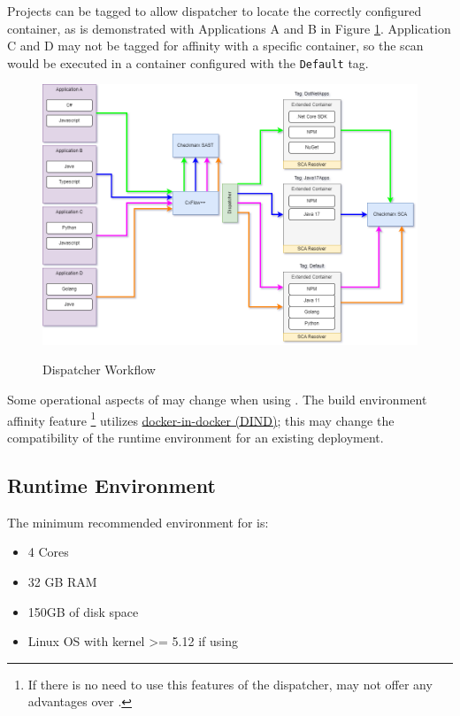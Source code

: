 Projects can be tagged to allow dispatcher to locate the correctly configured \scaresolver
container, as is demonstrated with Applications A and B in Figure \ref{fig:dispatcher_workflow}.
Application C and D may not be tagged for affinity with a specific container, so the
\scaresolver scan would be executed in a container configured with the \texttt{Default} tag.

\begin{figure}[h]
    \caption{\cxflowplusplus Dispatcher Workflow}
    \includegraphics[width=\textwidth]{graphics/dispatcher_workflow.png}
    \label{fig:dispatcher_workflow}
\end{figure}


Some operational aspects of \cxflow may change when using \cxflowplusplus.  The \cxflowplusplus 
build environment affinity feature
\footnote{If there is no need to use this features of the dispatcher, \cxflowplusplus may not offer any advantages over \cxflow.} 
utilizes
\href{https://www.docker.com/blog/docker-can-now-run-within-docker/}{docker-in-docker (DIND)}; this may
change the compatibility of the runtime environment for an existing \cxflow deployment.

\subsection{\cxflowplusplus Runtime Environment}

The minimum recommended environment for \cxflowplusplus is:

\begin{itemize}
    \item 4 Cores
    \item 32 GB RAM
    \item 150GB of disk space
    \item Linux OS with kernel >= 5.12 if using \sysbox
\end{itemize}

